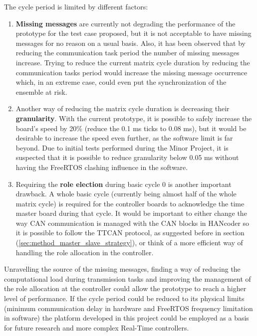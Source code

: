 \documentclass[table,xcdraw]{article}
\begin{document}
The cycle period is limited by different factors:
\begin{enumerate}
    \item \textbf{Missing messages} are currently not degrading the performance of the prototype for the test case proposed, but it is not acceptable to have missing messages for no reason on a usual basis. Also, it has been observed that by reducing the communication task period the number of missing messages increase. Trying to reduce the current matrix cycle duration by reducing the communication tasks period would increase the missing message occurrence which, in an extreme case, could even put the synchronization of the ensemble at risk.
    \item Another way of reducing the matrix cycle duration is decreasing their \textbf{granularity}. With the current prototype, it is possible to safely increase the board's speed by 20\% (reduce the 0.1 ms ticks to 0.08 ms), but it would be desirable to increase the speed even further, as the software limit is far beyond. Due to initial tests performed during the Minor Project, it is suspected that it is possible to reduce granularity below 0.05 ms without having the FreeRTOS clashing influence in the software.
    \item Requiring the \textbf{role election} during basic cycle 0 is another important drawback. A whole basic cycle (currently being almost half of the whole matrix cycle) is required for the controller boards to acknowledge the time master board during that cycle. It would be important to either change the way CAN communication is managed with the CAN blocks in HANcoder so it is possible to follow the TTCAN protocol, as suggested before in section (\ref{sec:method_master_slave_strategy}), or think of a more efficient way of handling the role allocation in the controller.
\end{enumerate}

Unravelling the source of the missing messages, finding a way of reducing the computational load during transmission tasks and improving the management of the role allocation at the controller could allow the prototype to reach a higher level of performance. If the cycle period could be reduced to its physical limits (minimum communication delay in hardware and FreeRTOS frequency limitation in software) the platform developed in this project could be employed as a basis for future research and more complex Real-Time controllers.


\end{document}
